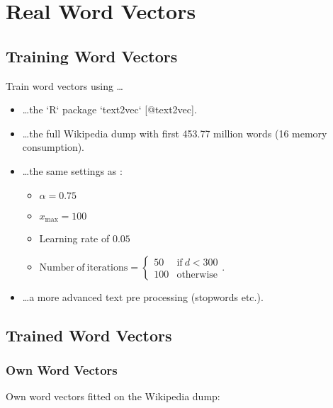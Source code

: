 \chapter{Real Word Vectors}\label{ch:real_wv}

\section{Training Word Vectors}

Train word vectors using \dots

\begin{itemize}
  \item 
    \dots the `R` package `text2vec` [@text2vec].

  \item 
    \dots the full Wikipedia dump with first 453.77 million words (16 %
    memory consumption).
  
  \item 
    \dots the same settings as \cite{pennington2014glove}:
    \begin{itemize}
      \item $\alpha = 0.75$
      \item $x_\mathrm{max} = 100$
      \item Learning rate of $0.05$
      \item $\mathrm{Number\ of\ iterations} = \left\{\begin{array}{cc}
            50 & \text{if} \ d < 300 \\
            100 & \text{otherwise}
            \end{array}\right.$.
    \end{itemize}

  \item 
    \dots a more advanced text pre processing (stopwords etc.).
\end{itemize}

\section{Trained Word Vectors}

\subsection{Own Word Vectors}

Own word vectors fitted on the Wikipedia dump:

